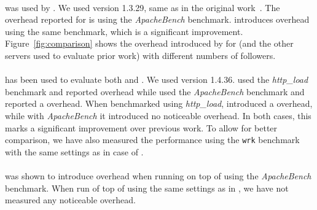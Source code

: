 \paragraph{\httpd} %
was used by \orchestra.  We used version 1.3.29, same as in the
original work~\cite{orchestra09}.  The overhead reported for
\orchestra is \orchestraHttpd using the \emph{ApacheBench}
benchmark. \varan introduces \httpdAbOneFollower overhead using the same
benchmark, which is a significant improvement.
Figure~\ref{fig:comparison} shows the overhead introduced by \varan for
\httpd (and the other servers used to evaluate prior work) with
different numbers of followers. 


\paragraph{\lighttpd} %
has been used to evaluate both \mx and \tachyon.  We used version
1.4.36. %
\mx used the \emph{http\_load} benchmark and reported \mxLighttpd overhead
while \tachyon used the \emph{ApacheBench} benchmark and reported a
\tachyonLighttpd overhead.  When benchmarked using \emph{http\_load},
\varan introduced a \lighttpdHttploadOneFollower overhead, while with
\emph{ApacheBench} it introduced no noticeable
overhead. %
In both
cases, this marks a significant improvement over previous work. To allow for
better comparison, we have also measured the performance using the
\lstinline`wrk` benchmark with the same settings as in case of \lighttpdtwo.

\paragraph{\thttpd} %
was shown to introduce \tachyonThttpd overhead when running on top of \tachyon using
the \emph{ApacheBench} benchmark. When run of top of \varan using the same settings
as in \cite{tachyon12}, we have not measured any noticeable overhead.

